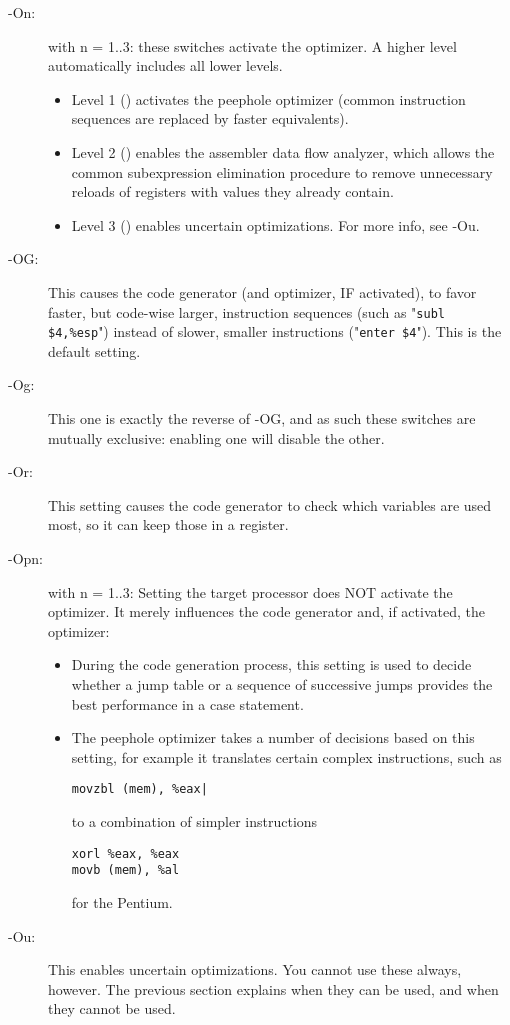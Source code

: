 {\begin{description}
\item [-On:\ ] with n = 1..3: these switches activate the optimizer.
A higher level automatically includes all lower levels.
\begin{itemize}
\item Level 1 () activates the peephole optimizer
 (common instruction sequences are replaced by faster equivalents).
\item Level 2 () enables the assembler data flow analyzer,
which allows the common subexpression elimination procedure to
remove unnecessary reloads of registers with values they already contain.
\item Level 3 () enables uncertain optimizations. For more info, see -Ou.
\end{itemize}
\item[-OG:\ ]
This causes the code generator (and optimizer, IF activated), to favor
faster, but code-wise larger, instruction sequences (such as
"\verb|subl $4,%esp|") instead of slower, smaller instructions
("\verb|enter $4|").  This is the default setting.

\item[-Og:\ ] This one is exactly the reverse of -OG, and as such these
switches are mutually exclusive: enabling one will disable the other.

\item[-Or:\ ] This setting causes the code generator to
check which variables are used most, so it can keep those in a register.

\item[-Opn:\ ] with n = 1..3: Setting the target processor does NOT
activate the optimizer. It merely influences the code generator and,
if activated, the optimizer:
\begin{itemize}
\item During the code generation process, this setting is used to
decide whether a jump table or a sequence of successive jumps provides
the best performance in a case statement.
\item The peephole optimizer takes a number of decisions based on this
setting, for example it translates certain complex instructions, such
as
\begin{verbatim}
movzbl (mem), %eax|
\end{verbatim}
to a combination of simpler instructions
\begin{verbatim}
xorl %eax, %eax
movb (mem), %al
\end{verbatim}
for the Pentium.
\end{itemize}
\item[-Ou:\ ] This enables uncertain optimizations. You cannot use these
always, however. The previous section explains when they can be used, and
when they cannot be used.
\end{description}

}
